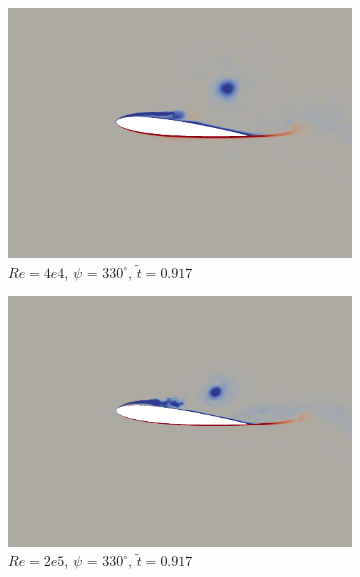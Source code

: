 \begin{figure}[H]
	\begin{subfigure}[b]{0.32\textwidth}
		\centering
		\includegraphics[width=1\textwidth]{figures/Vorticity_plots/Re_40k_1pt0/phase_330.png}
		\caption{$Re=4e4$, $\psi$ = $330^\circ$, $\tilde{t}=0.917$}
		\label{fig:Re_40k_1pt0_phi330}
	\end{subfigure}
	\begin{subfigure}[b]{0.32\textwidth}
		\centering
		\includegraphics[width=1\textwidth]{figures/Vorticity_plots/Re_200k_1pt0/phase_330.png}
		\caption{$Re=2e5$, $\psi$ = $330^\circ$, $\tilde{t}=0.917$}
		\label{fig:Re_200k_1pt0_phi330}
	\end{subfigure}
	\begin{subfigure}[b]{0.32\textwidth}
		\centering

\end{subfigure}
\end{figure}
